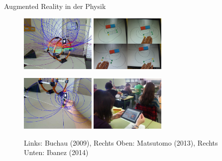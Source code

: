 \begin{frame}[fragile]{Augmented Reality in der Physik}
	\vspace{0.1cm}
\begin{figure}
	\includegraphics[width=0.32\textwidth]{images/papers/Buchau09.jpg}
	\hspace{0.05cm}
	\includegraphics[width=0.32\textwidth]{images/papers/Matsutomo13.jpg}

	\includegraphics[width=0.32\textwidth]{images/papers/Buchau09_Magnet.jpg}
	\hspace{0.05cm}
	\includegraphics[width=0.32\textwidth]{images/papers/Ibanez14.jpg}

	\setlength{\abovecaptionskip}{7pt plus 5pt minus 2pt}
	\caption*{Links: Buchau (2009), Rechts Oben: Matsutomo (2013), Rechts Unten: Ibanez (2014)}
\end{figure}
\end{frame}

